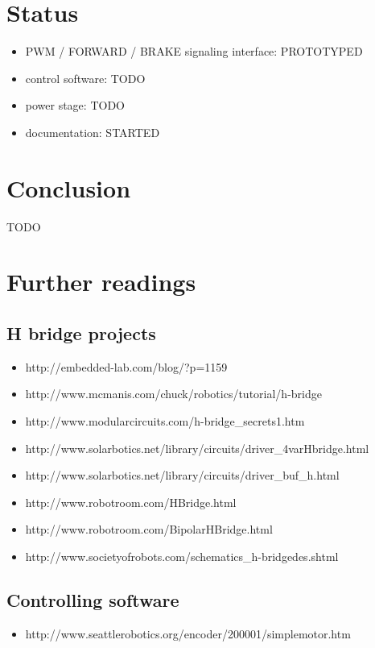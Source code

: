 \documentclass[12pt]{article}
\begin{document}
\newpage
\section{Status}
\begin{itemize}
  \item PWM / FORWARD / BRAKE signaling interface: PROTOTYPED
  \item control software: TODO
  \item power stage: TODO
  \item documentation: STARTED
\end{itemize}


\newpage
\section{Conclusion}
TODO


\newpage
\section{Further readings}

\subsection{H bridge projects}
\begin{itemize}
  \item http://embedded-lab.com/blog/?p=1159
  \item http://www.mcmanis.com/chuck/robotics/tutorial/h-bridge
  \item http://www.modularcircuits.com/h-bridge\_secrets1.htm
  \item http://www.solarbotics.net/library/circuits/driver\_4varHbridge.html
  \item http://www.solarbotics.net/library/circuits/driver\_buf\_h.html
  \item http://www.robotroom.com/HBridge.html
  \item http://www.robotroom.com/BipolarHBridge.html
  \item http://www.societyofrobots.com/schematics\_h-bridgedes.shtml
\end{itemize}

\subsection{Controlling software}
\begin{itemize}
  \item http://www.seattlerobotics.org/encoder/200001/simplemotor.htm
\end{itemize}
\end{document}
